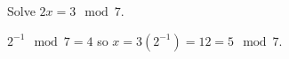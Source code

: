 \question Solve $2x = 3 \mod 7.$
\begin{solution}
$2^{-1} \mod 7 = 4$ so $x = 3(2^{-1}) = 12 = 5 \mod 7.$
\end{solution}